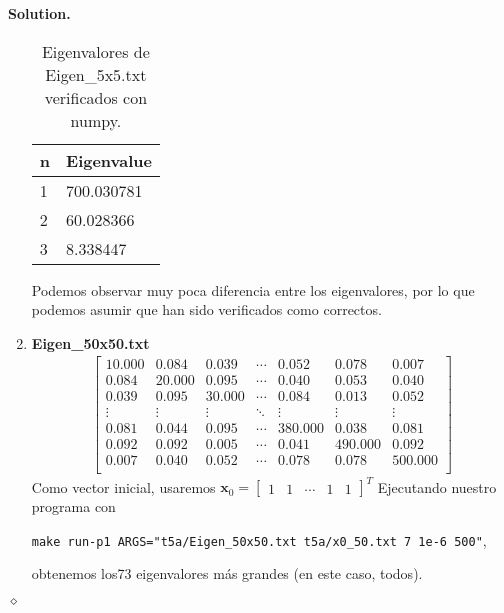 \documentclass{article}
\theoremstyle{problemstyle}
\newenvironment{solution}{%
  \begin{mdframed}[linewidth=0.8pt,linecolor=Gray,backgroundcolor=Gray!5,roundcorner=5pt]%
  \noindent\textbf{Solution.}%
}{%
\hfill $ \diamond $ 
  \end{mdframed}%
}
\begin{document}
\begin{solution}
\begin{enumerate}
\begin{table}[H]
\begin{center}
				      \begin{tabular}{|l|l|}
					      \hline
					      n & Eigenvalue \\
					      \hline
					      1 & 700.030781 \\
					      \hline
					      2 & 60.028366  \\
					      \hline
					      3 & 8.338447   \\
					      \hline
				      \end{tabular}
			      \end{center}
			      \caption{Eigenvalores de Eigen\_5x5.txt verificados con numpy.}\label{tab:py5x5}
		      \end{table}
		      Podemos observar muy poca diferencia entre los eigenvalores, por lo
		      que podemos asumir que han sido verificados como correctos.
        \item \textbf{Eigen\_50x50.txt}
		      \begin{align*}
			      \begin{bmatrix}
				      10.000 & 0.084  & 0.039  & \cdots & 0.052   & 0.078   & 0.007   \\
				      0.084  & 20.000 & 0.095  & \cdots & 0.040   & 0.053   & 0.040   \\
				      0.039  & 0.095  & 30.000 & \cdots & 0.084   & 0.013   & 0.052   \\
				      \vdots & \vdots & \vdots & \ddots & \vdots  & \vdots  & \vdots  \\
				      0.081  & 0.044  & 0.095  & \cdots & 380.000 & 0.038   & 0.081   \\
				      0.092  & 0.092  & 0.005  & \cdots & 0.041   & 490.000 & 0.092   \\
				      0.007  & 0.040  & 0.052  & \cdots & 0.078   & 0.078   & 500.000 \\
			      \end{bmatrix}
		      \end{align*}
		      Como vector inicial, usaremos $ \mathbf{x}_0 = \begin{bmatrix}
				      1 & 1 & \cdots & 1 & 1
			      \end{bmatrix}^{T} $
		      Ejecutando nuestro programa con
		      \begin{center}
			      \texttt{make run-p1
				      ARGS="t5a/Eigen\_50x50.txt t5a/x0\_50.txt 7 1e-6 500"},
		      \end{center}
		      obtenemos los73 eigenvalores m\'as grandes (en este caso, todos).
		      \begin{table}[H]

\end{table}
\end{enumerate}
\end{solution}
\end{document}
